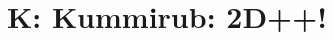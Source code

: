 \documentclass[12pt,oneside]{article} %
\begin{document}
%
%

%
%

\newpage
\section*{K: Kummirub: 2D++!} %



%
%
\end{document}
